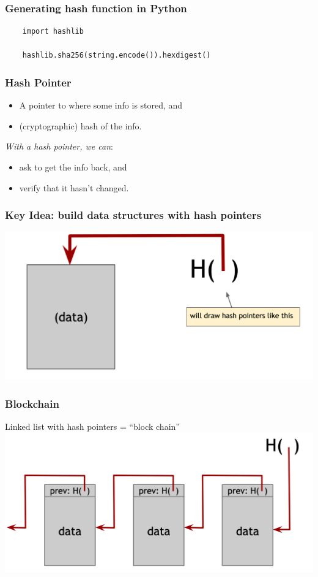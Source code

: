 \documentclass{beamer}
\begin{document}
\begin{frame}[fragile]
  \frametitle{Generating hash function in Python}
  
	\begin{verbatim}
	import hashlib
	
	hashlib.sha256(string.encode()).hexdigest()
	\end{verbatim}

\end{frame}
\begin{frame}
  \frametitle{Hash Pointer}
	\begin{itemize}
		\item A pointer to where some info is stored, and
    		\item (cryptographic) hash of the info.
	\end{itemize}

	\pause
	\emph{With a hash pointer, we can}:

	\begin{itemize}
		\item ask to get the info back, and
    		\item verify that it hasn't changed.
	\end{itemize}
\end{frame}
\begin{frame}
  \frametitle{Key Idea: build data structures with hash pointers}

	\includegraphics[scale=0.5]{pointer1} 
\end{frame}
\begin{frame}
  \frametitle{Blockchain}
{\Large{Linked list with hash pointers = ``block chain''}}
	\includegraphics[scale=0.5]{pointer2} 
\end{frame}
\end{document}
